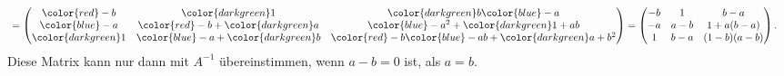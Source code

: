 \begin{loesung}
\begin{align*}
&=
\begin{pmatrix}
{\color{red}-b}      &{\color{darkgreen}1}                 &{\color{darkgreen}b}{\color{blue}-a}        \\
{\color{blue}-a}     &{\color{red}-b}+{\color{darkgreen}a} &{\color{blue}-a^2}+{\color{darkgreen}1+ab}  \\
{\color{darkgreen}1} &{\color{blue}-a}+{\color{darkgreen}b}&{\color{red}-b}{\color{blue}-ab}+{\color{darkgreen}a+b^2}\\
\end{pmatrix}
=
\begin{pmatrix}
-b       & 1         &b-a        \\
-a       &a-b       &1+a(b-a)  \\
 1       &b-a       &(1-b)(a-b)\\
\end{pmatrix}.
\end{align*}
Diese Matrix kann nur dann mit $A^{-1}$ übereinstimmen, wenn $a-b=0$ ist, 
als $a=b$.
\end{loesung}

